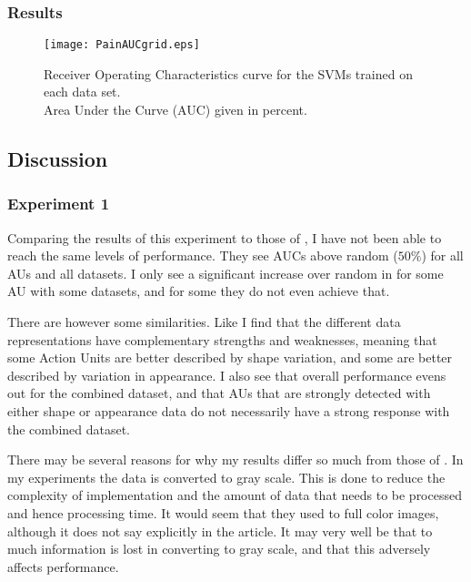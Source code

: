 \documentclass[Main]{subfiles}
\begin{document}


		\subsubsection{Results} %
			\label{ssub:results_ex2}
			\begin{figure}[H]
				\begin{center}
					\texttt{[image: PainAUCgrid.eps]}
				\end{center}
				\caption{
					Receiver Operating Characteristics curve for the SVMs trained on each data set.\\
					Area Under the Curve (AUC) given in percent.
					}
				\label{fig:pain_auc}
			\end{figure}
				
		

	\subsection{Discussion} %
		\label{sub:discussion}
		\subsubsection{Experiment 1} %
			\label{ssub:experiment_1}
			Comparing the results of this experiment to those of \cite{Lucey2011}, I have not been able to reach the same levels of performance.
			They see AUCs above random ($50\%$) for all AUs and all datasets.
			I only see a significant increase over random in for some AU with some datasets, and for some they do not even achieve that.

			There are however some similarities.
			Like \cite{Lucey2011} I find that the different data representations have complementary strengths and weaknesses, meaning that some Action Units are better described by shape variation, and some are better described by variation in appearance.
			I also see that overall performance evens out for the combined dataset, and that AUs that are strongly detected with either shape or appearance data do not necessarily have a strong response with the combined dataset.

			There may be several reasons for why my results differ so much from those of \cite{Lucey2011}.
			In my experiments the data is converted to gray scale.
			This is done to reduce the complexity of implementation and the amount of data that needs to be processed and hence processing time.
			It would seem that they used to full color images, although it does not say explicitly in the article.
			It may very well be that to much information is lost in converting to gray scale, and that this adversely affects performance.
\end{document}
